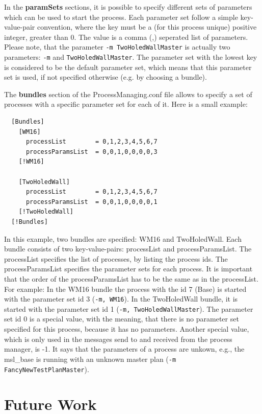 In the \textbf{paramSets} sections, it is possible to specify different sets of parameters which can be used to start the process. Each parameter set follow a simple key-value-pair convention, where the key must be a (for this process unique) positive integer, greater than 0. The value is a comma (,) seperated list of parameters. Please note, that the parameter \verb#-m TwoHoledWallMaster# is actually two parameters: \verb#-m# and \verb#TwoHoledWallMaster#. The parameter set with the lowest key is considered to be the default parameter set, which means that this parameter set is used, if not specified otherwise (e.g. by choosing a bundle).

The \textbf{bundles} section of the ProcessManaging.conf file allows to specify a set of processes with a specific parameter set for each of it. Here is a small example:

\begin{verbatim}
  [Bundles]
    [WM16]
      processList        = 0,1,2,3,4,5,6,7
      processParamsList  = 0,0,1,0,0,0,0,3
    [!WM16]

    [TwoHoledWall]
      processList        = 0,1,2,3,4,5,6,7
      processParamsList  = 0,0,1,0,0,0,0,1
    [!TwoHoledWall]
  [!Bundles]
\end{verbatim}

In this example, two bundles are specified: WM16 and TwoHoledWall. Each bundle consists of two key-value-pairs: processList and processParamsList. The processList specifies the list of processes, by listing the process ids. The processParamsList specifies the parameter sets for each process. It is important that the order of the processParamsList has to be the same as in the processList. For example: In the WM16 bundle the process with the id 7 (Base) is started with the parameter set id 3 (\verb#-m, WM16#). In the TwoHoledWall bundle, it is started with the parameter set id 1 (\verb#-m, TwoHoledWallMaster#).
The parameter set id 0 is a special value, with the meaning, that there is no parameter set specified for this process, because it has no parameters. 
Another special value, which is only used in the messages send to and received from the process manager, is -1. It says that the parameters of a process are unkown, e.g., the msl\_base is running with an unknown master plan (\verb#-m FancyNewTestPlanMaster#).

\section{Future Work}
\label{sec:ProcManFutureWork}

